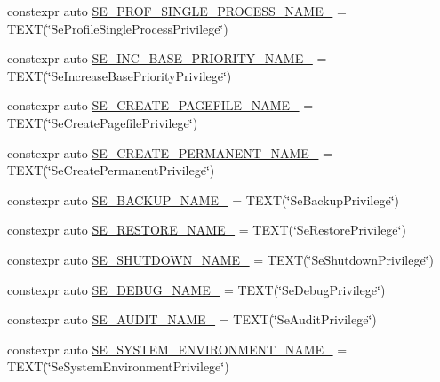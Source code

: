 \begin{DoxyCompactItemize}
\item 
constexpr auto \mbox{\hyperlink{namespaceboost_1_1winapi_ad2afe2d90887ceb14d6f0317cadd0be0}{S\+E\+\_\+\+P\+R\+O\+F\+\_\+\+S\+I\+N\+G\+L\+E\+\_\+\+P\+R\+O\+C\+E\+S\+S\+\_\+\+N\+A\+M\+E\+\_\+}} = T\+E\+XT(\char`\"{}Se\+Profile\+Single\+Process\+Privilege\char`\"{})
\item 
constexpr auto \mbox{\hyperlink{namespaceboost_1_1winapi_a40a3a4729bfad4ba832415aa3069a289}{S\+E\+\_\+\+I\+N\+C\+\_\+\+B\+A\+S\+E\+\_\+\+P\+R\+I\+O\+R\+I\+T\+Y\+\_\+\+N\+A\+M\+E\+\_\+}} = T\+E\+XT(\char`\"{}Se\+Increase\+Base\+Priority\+Privilege\char`\"{})
\item 
constexpr auto \mbox{\hyperlink{namespaceboost_1_1winapi_a65259dea10019634b8b40eac75f153ee}{S\+E\+\_\+\+C\+R\+E\+A\+T\+E\+\_\+\+P\+A\+G\+E\+F\+I\+L\+E\+\_\+\+N\+A\+M\+E\+\_\+}} = T\+E\+XT(\char`\"{}Se\+Create\+Pagefile\+Privilege\char`\"{})
\item 
constexpr auto \mbox{\hyperlink{namespaceboost_1_1winapi_aa60957df0d83a2b41e92c08afd153005}{S\+E\+\_\+\+C\+R\+E\+A\+T\+E\+\_\+\+P\+E\+R\+M\+A\+N\+E\+N\+T\+\_\+\+N\+A\+M\+E\+\_\+}} = T\+E\+XT(\char`\"{}Se\+Create\+Permanent\+Privilege\char`\"{})
\item 
constexpr auto \mbox{\hyperlink{namespaceboost_1_1winapi_aeef12453f5b08b1b0796a2d201e25db6}{S\+E\+\_\+\+B\+A\+C\+K\+U\+P\+\_\+\+N\+A\+M\+E\+\_\+}} = T\+E\+XT(\char`\"{}Se\+Backup\+Privilege\char`\"{})
\item 
constexpr auto \mbox{\hyperlink{namespaceboost_1_1winapi_a3839ae610aa2b16db98e14cfd1255bae}{S\+E\+\_\+\+R\+E\+S\+T\+O\+R\+E\+\_\+\+N\+A\+M\+E\+\_\+}} = T\+E\+XT(\char`\"{}Se\+Restore\+Privilege\char`\"{})
\item 
constexpr auto \mbox{\hyperlink{namespaceboost_1_1winapi_aff9da0a1831bc20a284b22f39f42a70f}{S\+E\+\_\+\+S\+H\+U\+T\+D\+O\+W\+N\+\_\+\+N\+A\+M\+E\+\_\+}} = T\+E\+XT(\char`\"{}Se\+Shutdown\+Privilege\char`\"{})
\item 
constexpr auto \mbox{\hyperlink{namespaceboost_1_1winapi_a66c159cf8f57c429d60316408747638e}{S\+E\+\_\+\+D\+E\+B\+U\+G\+\_\+\+N\+A\+M\+E\+\_\+}} = T\+E\+XT(\char`\"{}Se\+Debug\+Privilege\char`\"{})
\item 
constexpr auto \mbox{\hyperlink{namespaceboost_1_1winapi_a1f2a008a33dfb6f089f034173b880da8}{S\+E\+\_\+\+A\+U\+D\+I\+T\+\_\+\+N\+A\+M\+E\+\_\+}} = T\+E\+XT(\char`\"{}Se\+Audit\+Privilege\char`\"{})
\item 
constexpr auto \mbox{\hyperlink{namespaceboost_1_1winapi_ae7a5b94d22e342ee8040621457878524}{S\+E\+\_\+\+S\+Y\+S\+T\+E\+M\+\_\+\+E\+N\+V\+I\+R\+O\+N\+M\+E\+N\+T\+\_\+\+N\+A\+M\+E\+\_\+}} = T\+E\+XT(\char`\"{}Se\+System\+Environment\+Privilege\char`\"{})

\end{DoxyCompactItemize}
